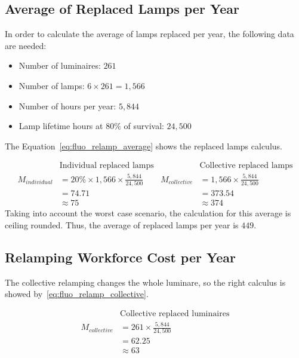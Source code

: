 \subsection{Average of Replaced Lamps per Year}
In order to calculate the average of lamps replaced per year, the following data are needed:
\begin{itemize}
\item Number of luminaires: $261$
\item Number of lamps: $6 \times 261 = 1,566$
\item Number of hours per year: $5,844$
\item Lamp lifetime hours at $80\%$ of survival: $24,500$
\end{itemize}

The Equation~\ref{eq:fluo_relamp_average} shows the replaced lamps calculus.

\begin{equation}
\begin{split}
 & \text{Individual replaced lamps} \\
M_{individual} & = 20\% \times 1,566 \times \frac{5,844}{24,500} \\
 & = 74.71 \\
 & \approx 75
\end{split}
\begin{split}
 & \text{Collective replaced lamps} \\
M_{collective} & = 1,566 \times \frac {5,844}{24,500} \\
 & = 373.54 \\
 & \approx 374
\end{split}
\label{eq:fluo_relamp_average}
\end{equation}
Taking into account the worst case scenario, the calculation for this average is ceiling rounded. Thus, the average of replaced lamps per year is $449$.

\subsection{Relamping Workforce Cost per Year}
The collective relamping changes the whole luminare, so the right calculus is showed by~\ref{eq:fluo_relamp_collective}.

\begin{equation}
\begin{split}
 & \text{Collective replaced luminaires} \\
M_{collective} & = 261 \times \frac {5,844}{24,500} \\
 & = 62.25 \\
 & \approx 63
\end{split}
\label{eq:fluo_relamp_collective}
\end{equation}


